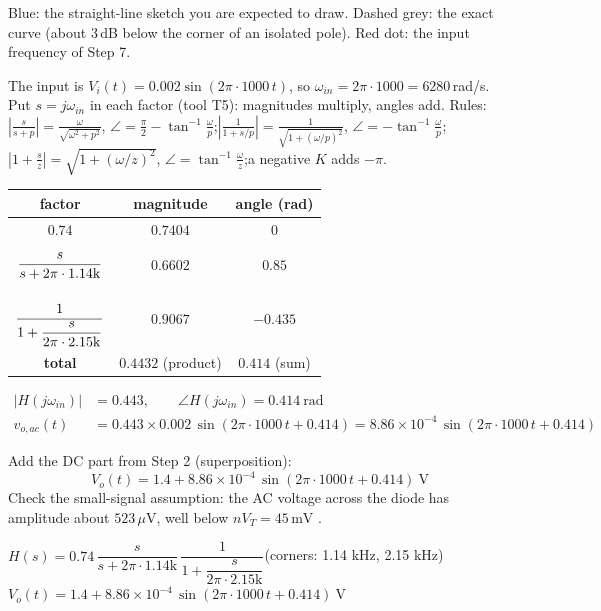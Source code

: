 \documentclass[11pt]{article}
\newcommand{\solstep}[2]{\par\medskip{\color{stepc}\textbf{Step #1 --- #2}}\par\nopagebreak}
\begin{document}
{\small Blue: the straight-line sketch you are expected to draw. Dashed grey: the exact curve (about 3\,dB below the corner of an isolated pole). Red dot: the input frequency of Step 7.}
\solstep{7}{Total output (DC + AC)}The input is $V_i(t) = 0.002\sin\left(2\pi\cdot 1000\,t\right)$, so $\omega_{in} = 2\pi\cdot 1000 = 6280$\,rad/s. Put $s=j\omega_{in}$ in each factor (tool T5): magnitudes multiply, angles add.
{\small Rules: $\left|\frac{s}{s+p}\right| = \frac{\omega}{\sqrt{\omega^2+p^2}}$, $\angle = \frac{\pi}{2}-\tan^{-1}\frac{\omega}{p}$;\quad $\left|\frac{1}{1+s/p}\right| = \frac{1}{\sqrt{1+(\omega/p)^2}}$, $\angle = -\tan^{-1}\frac{\omega}{p}$;\quad $\left|1+\frac{s}{z}\right| = \sqrt{1+(\omega/z)^2}$, $\angle = \tan^{-1}\frac{\omega}{z}$;\quad a negative $K$ adds $-\pi$.}
\begin{center}\renewcommand{\arraystretch}{1.35}
\begin{tabular}{ccc}
\toprule
factor & magnitude & angle (rad) \\
\midrule
$0.74$ & $0.7404$ & $0$ \\
$\rule[-1.1em]{0pt}{2.8em}\dfrac{s}{s+2\pi\cdot 1.14\mathrm{k}}$ & $0.6602$ & $0.85$ \\
$\rule[-1.7em]{0pt}{4em}\dfrac{1}{1+\dfrac{s}{2\pi\cdot 2.15\mathrm{k}}}$ & $0.9067$ & $-0.435$ \\
\textbf{total} & $\mathbf{0.4432}$ (product) & $\mathbf{0.414}$ (sum) \\
\bottomrule
\end{tabular}\end{center}

\begin{align*}
|H(j\omega_{in})| &= 0.443, \qquad \angle H(j\omega_{in}) = 0.414\ \mathrm{rad} \\
v_{o,ac}(t) &= 0.443\times 0.002\,\sin\left(2\pi\cdot 1000\,t + 0.414\right) = 8.86\times 10^{-4}\,\sin\left(2\pi\cdot 1000\,t + 0.414\right)
\end{align*}

Add the DC part from Step 2 (superposition):
\[
\boxed{V_o(t) = 1.4 + 8.86\times 10^{-4}\,\sin\left(2\pi\cdot 1000\,t + 0.414\right)\ \mathrm{V}}
\]
 Check the small-signal assumption: the AC voltage across the diode has amplitude about $523\,\mu \mathrm{V}$, well below $nV_T = 45\,\mathrm{m}\mathrm{V}$ \checkmark.
\begin{ansbox}
$H(s) = 0.74\,\dfrac{s}{s+2\pi\cdot 1.14\mathrm{k}}\,\dfrac{1}{1+\dfrac{s}{2\pi\cdot 2.15\mathrm{k}}}$\quad (corners: 1.14 kHz, 2.15 kHz)\\[4pt]
$V_o(t) = 1.4 + 8.86\times 10^{-4}\,\sin\left(2\pi\cdot 1000\,t + 0.414\right)\ \mathrm{V}$
\end{ansbox}
\end{document}
